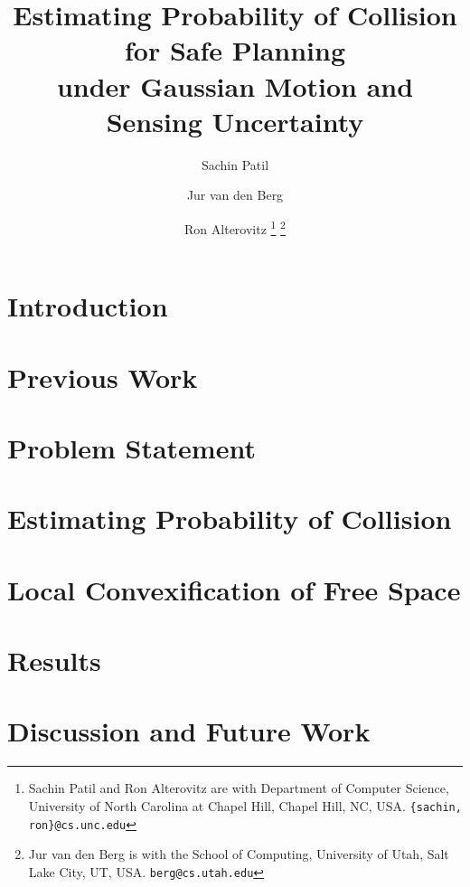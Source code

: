 \documentclass[letterpaper, 10 pt, conference]{ieeeconf}
\title{\LARGE \bf
Estimating Probability of Collision for Safe Planning \\ under Gaussian Motion and Sensing Uncertainty
}
\author{Sachin Patil \and Jur van den Berg \and Ron Alterovitz%
\thanks{Sachin Patil and Ron Alterovitz are with Department of Computer Science, University of North Carolina at Chapel Hill, Chapel Hill, NC, USA.
       {\tt\small \{sachin, ron\}@cs.unc.edu}}%
\thanks{Jur van den Berg is with the School of Computing, University of Utah, Salt Lake City, UT, USA.
       {\tt\small berg@cs.utah.edu}}%
}
\begin{document}
\maketitle
\thispagestyle{empty}
\pagestyle{empty}



\section{Introduction} \label{sec:intro}


\section{Previous Work} \label{sec:prevwork}


\section{Problem Statement} \label{sec:problem}


\section{Estimating Probability of Collision} \label{sec:probcol}


\section{Local Convexification of Free Space} \label{sec:cvxfn}


\section{Results} \label{sec:results}


\section{Discussion and Future Work} \label{sec:discussion}






\end{document}
